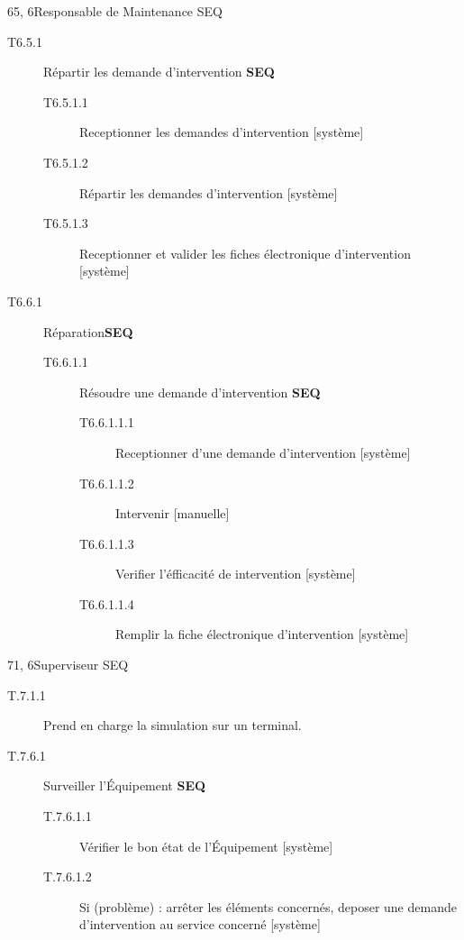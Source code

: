 \dta
{6}{5, 6}{Responsable de Maintenance}
{SEQ}
{
\begin{description}
	\item[T6.5.1] Répartir les demande d'intervention \textbf{SEQ}
	\begin{description}
		\item[T6.5.1.1] Receptionner les demandes d'intervention [système]
		\item[T6.5.1.2] Répartir les demandes d'intervention [système]
		\item[T6.5.1.3] Receptionner et valider les fiches électronique d'intervention [système]
	\end{description}
	\item[T6.6.1] Réparation\textbf{SEQ}
	\begin{description}
		\item[T6.6.1.1] Résoudre une demande d'intervention \textbf{SEQ}
		\begin{description}
			\item[T6.6.1.1.1] Receptionner d'une demande d'intervention [système]
			\item[T6.6.1.1.2] Intervenir [manuelle]
			\item[T6.6.1.1.3] Verifier l'éfficacité de intervention [système]
			\item[T6.6.1.1.4] Remplir la fiche électronique d'intervention [système]
		\end{description}
	\end{description}
\end{description}
}

\hspace{1cm}

\dta
{7}{1, 6}{Superviseur}
{SEQ}
{
\begin{description}
	\item[T.7.1.1] Prend en charge la simulation sur un terminal.
	\item[T.7.6.1] Surveiller l'Équipement \textbf{SEQ}
	\begin{description}
		\item[T.7.6.1.1] Vérifier le bon état de l'Équipement [système]
		\item[T.7.6.1.2] Si (problème) : arrêter les éléments concernés, deposer une demande d'intervention au service concerné [système]
	\end{description}
\end{description}
}

\hspace{1cm}


